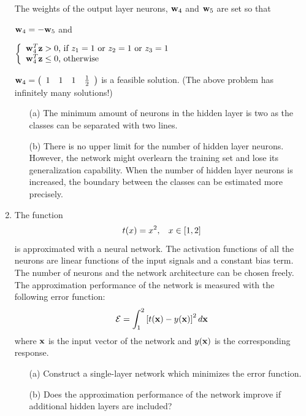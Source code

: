 \documentclass[10pt]{article}
\newcommand{\vect}[1]{{\bf{#1}}}
\begin{document}
\begin{enumerate}
The weights of the output layer neurons,
$\vect{w}_4$ and $\vect{w}_5$ are set so that

$\vect{w}_4=-\vect{w}_5$ and

$\left\{\begin{array}{l}
\vect{w}_4^T\vect{z} > 0 \mbox{, if } z_1=1 \mbox{ or } z_2=1 \mbox{
or } z_3=1\\
\vect{w}_4^T\vect{z} \leq 0 \mbox{, otherwise}
\end{array}\right.$

$\vect{w}_4=\left(\begin{array}{cccc}1&1&1&\frac{1}{2}\end{array}\right)$ is a feasible solution. (The above problem has infinitely many solutions!)
\begin{enumerate}
\item[(a)] The minimum amount of neurons in the hidden layer is two as the classes can be separated with two lines.
\item[(b)] There is no upper limit for the number of hidden layer
neurons. However, the network might overlearn the training set and
lose its generalization capability. When the number of hidden layer
neurons is increased, the boundary between the classes can be
estimated more precisely.
\end{enumerate}



\vspace{2mm}

\vspace{2cm}
\item The function
\[
t(x) = x^2, \hspace{3mm} x \in \left[ 1, 2 \right]
\]
is approximated with a neural network. The activation functions of all
the neurons are linear functions of the input signals and a constant
bias term. The number of neurons and the network architecture can be
chosen freely. The approximation performance of the network is
measured with the following error function:
\[
\mathcal{E} = \int_{1}^2 \left[ t({\bf x})-y({\bf x}) \right]^2 d{\bf x}
\]
where $\vect{x}$ is the input vector of the network and $y(\vect{x})$ is the
corresponding response.
\begin{itemize}
\item[(a)] Construct a single-layer network which minimizes the error function.
\item[(b)] Does the approximation performance of the network improve if
  additional hidden layers are included?
\end{itemize}


\end{enumerate}
\end{document}
